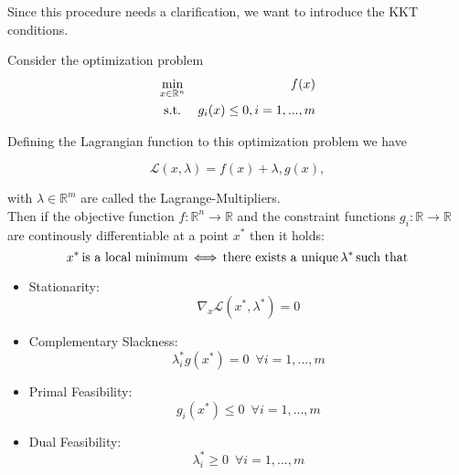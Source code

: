         Since this procedure needs a clarification, we want to introduce the KKT conditions.

            \begin{theorem}
                Consider the optimization problem
                \begin{eqnarray}
                    \min_{x \in \mathbb{R}^{n}} &&f(x) \notag \\
                    \textnormal{s.t.} \,\, && g_{i}(x) \le 0, i = 1, ..., m \notag
                \end{eqnarray}

                Defining the Lagrangian function to this optimization problem we have

                \begin{equation}
                    \mathcal{L}(x, \lambda) = f(x) + \lambda, g(x),
                \end{equation}

                with $\lambda \in \mathbb{R}^{m}$ are called the Lagrange-Multipliers.\\

                Then if the objective function $f: \mathbb{R}^{n} \longrightarrow \mathbb{R}$ and the constraint functions $g_{i}: \mathbb{R} \longrightarrow \mathbb{R}$ are continously differentiable at a point $x^{*}$ then it holds:\\
                $$x^{*} \, \textnormal{is a local minimum} \, \Longleftrightarrow \, \textnormal{there exists a unique} \, \lambda^{*} \, \textnormal{such that}$$
                \begin{itemize}
                    \item Stationarity:
                    $$\nabla_{x} \mathcal{L}(x^{*}, \lambda^{*}) = 0$$
                    \item Complementary Slackness:
                    $$\lambda^{*}_{i} g(x^{*}) = 0 \, \, \, \forall i = 1, ..., m$$
                    \item Primal Feasibility:
                    $$g_{i}(x^{*}) \le 0 \, \, \, \forall i = 1, ..., m$$
                    \item Dual Feasibility:
                    $$\lambda^{*}_{i} \ge 0 \, \, \, \forall i = 1, ..., m$$
                \end{itemize}
            \end{theorem}

